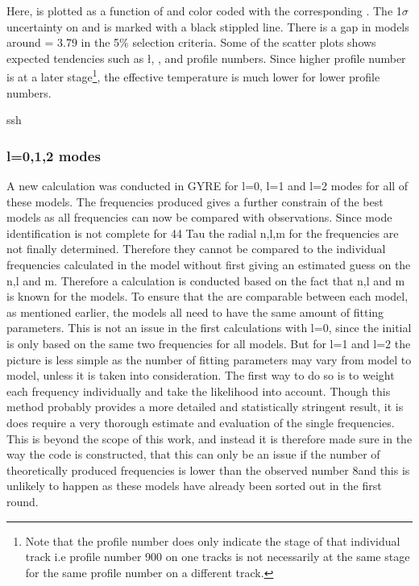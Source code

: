 Here, \logg is plotted as a function of \teff and color coded with the corresponding \chis. The 1$\sigma$ uncertainty on \logg and \teff is marked with a black stippled line. There is a gap in models around \teff = 3.79 in the 5\% selection criteria. Some of the scatter plots shows expected tendencies such as \l, \logg, \teff and profile numbers. Since higher profile number is at a later stage\footnote{Note that the profile number does only indicate the stage of that individual track i.e profile number 900 on one tracks is not necessarily at the same stage for the same profile number on a different track. }, the effective temperature is much lower for lower profile numbers. 

ssh 




\subsubsection{l=0,1,2 modes}
A new calculation was conducted in GYRE for l=0, l=1 and l=2 modes for all of these models. The frequencies produced gives a further constrain of the best models as all frequencies can now be compared with observations. Since mode identification is not complete for 44 Tau the radial n,l,m for the frequencies are not finally determined. Therefore they cannot be compared to the individual frequencies calculated in the model without first giving an estimated guess on the n,l and m. Therefore a calculation is conducted based on the fact that n,l and m is known for the models. To ensure that the \chis are comparable between each model, as mentioned earlier, the models all need to have the same amount of fitting parameters. This is not an issue in the first \chis calculations with l=0, since the initial \chis is only based on the same two frequencies for all models. But for l=1 and l=2 the picture is less simple as the number of fitting parameters may vary from model to model, unless it is taken into consideration. The first way to do so is to weight each frequency individually and take the likelihood into account. Though this method probably provides a more detailed and statistically stringent result, it is does require a  very thorough estimate and evaluation of the single frequencies. This is beyond the scope of this work, and instead it is therefore made sure in the way the code is constructed, that this can only be an issue if the number of theoretically produced frequencies is lower than the observed number 8and this is unlikely to happen as these models have already been sorted out in the first \chis round. 

